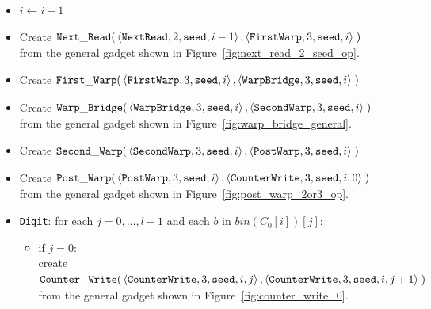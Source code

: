 \begin{itemize}
    \item $i \gets i + 1$

    \item Create
    $\begin{aligned}[t]
        {\tt Next\_Read}(&\left\langle {\tt NextRead},  2, {\tt seed}, i - 1 \right\rangle,
                   \left\langle {\tt FirstWarp}, 3, {\tt seed}, i     \right\rangle \;)
    \end{aligned}$\\ from the general gadget shown in Figure~\ref{fig:next_read_2_seed_op}.

    \item Create
    $\begin{aligned}[t]
        {\tt First\_Warp}(&\left\langle {\tt FirstWarp},  3, {\tt seed}, i \right\rangle,
                    \left\langle {\tt WarpBridge}, 3, {\tt seed}, i \right\rangle \;)
    \end{aligned}$

    \item Create
    $\begin{aligned}[t]
        {\tt Warp\_Bridge}(&\left\langle {\tt WarpBridge}, 3, {\tt seed}, i \right\rangle,
                     \left\langle {\tt SecondWarp}, 3, {\tt seed}, i \right\rangle \;)
    \end{aligned}$\\ from the general gadget shown in Figure~\ref{fig:warp_bridge_general}.

    \item Create
    $\begin{aligned}[t]
        {\tt Second\_Warp}(&\left\langle {\tt SecondWarp}, 3, {\tt seed}, i  \right\rangle,
                     \left\langle {\tt PostWarp},   3, {\tt seed}, i  \right\rangle \;)
    \end{aligned}$

    \item Create
    $\begin{aligned}[t]
        {\tt Post\_Warp}(&\left\langle {\tt PostWarp}, 3, {\tt seed}, i    \right\rangle,
                   \left\langle {\tt CounterWrite},    3, {\tt seed}, i, 0 \right\rangle \;)
    \end{aligned}$\\from the general gadget shown in Figure~\ref{fig:post_warp_2or3_op}.


    \item {\tt Digit}: for each $j=0,\ldots,l-1$ and each $b$ in $bin(C_0[i])[j]$:
    \begin{itemize}
        \item if $j = 0$:\\ create
        $\begin{aligned}[t]
            {\tt Counter\_Write}(&\left\langle {\tt CounterWrite}, 3, {\tt seed}, i, j \right\rangle, \left\langle {\tt CounterWrite}, 3, {\tt seed}, i, j + 1 \right\rangle \;)
        \end{aligned}$\\from the general gadget shown in Figure~\ref{fig:counter_write_0}.


\end{itemize}
\end{itemize}
